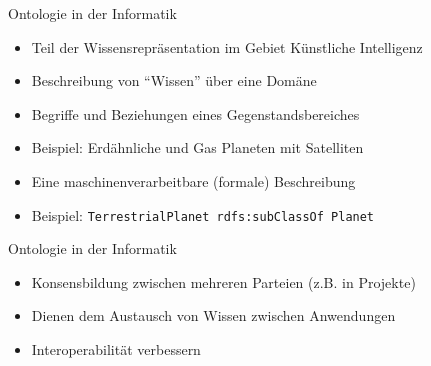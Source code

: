 \documentclass{beamer}
\begin{document}
\begin{frame}{Ontologie in der Informatik}
	
	\begin{itemize}
		\item Teil der Wissensrepräsentation im Gebiet Künstliche Intelligenz
		\item Beschreibung von ``Wissen'' über eine Domäne
		\item Begriffe und Beziehungen eines Gegenstandsbereiches
		\item Beispiel: Erdähnliche und Gas Planeten mit Satelliten
		\item Eine maschinenverarbeitbare (formale) Beschreibung 
		\item Beispiel: \texttt{TerrestrialPlanet rdfs:subClassOf Planet}
	\end{itemize}
	
\end{frame}

\begin{frame}{Ontologie in der Informatik}
	
	\begin{itemize}
		\item Konsensbildung zwischen mehreren Parteien (z.B. in Projekte)
		\item Dienen dem Austausch von Wissen zwischen Anwendungen
		\item Interoperabilität verbessern
	\end{itemize}
	
\end{frame}
\end{document}
